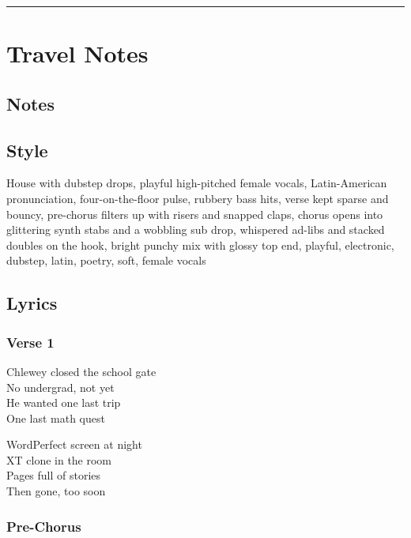\documentclass[]{article}
\begin{document}
\begin{center}\rule{0.5\linewidth}{0.5pt}\end{center}

\section{Travel Notes}\label{travel-notes}

\subsection{Notes}\label{notes-29}

\subsection{Style}\label{style-29}

House with dubstep drops, playful high-pitched female vocals,
Latin-American pronunciation, four-on-the-floor pulse, rubbery bass
hits, verse kept sparse and bouncy, pre-chorus filters up with risers
and snapped claps, chorus opens into glittering synth stabs and a
wobbling sub drop, whispered ad-libs and stacked doubles on the hook,
bright punchy mix with glossy top end, playful, electronic, dubstep,
latin, poetry, soft, female vocals

\subsection{Lyrics}\label{lyrics-29}

\subsubsection{Verse 1}\label{verse-1-20}

Chlewey closed the school gate\\
No undergrad, not yet\\
He wanted one last trip\\
One last math quest

WordPerfect screen at night\\
XT clone in the room\\
Pages full of stories\\
Then gone, too soon

\subsubsection{Pre-Chorus}\label{pre-chorus-34}
\end{document}
